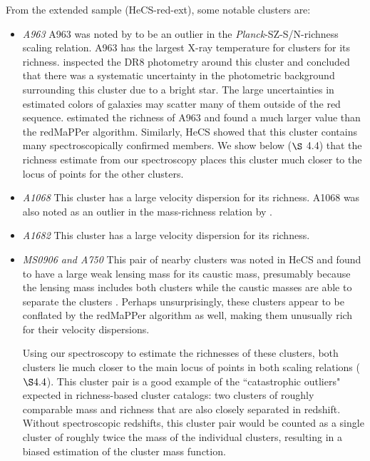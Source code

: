 From the extended sample (HeCS-red-ext), some notable clusters are:

\begin{itemize}

\item{\em A963} A963 was noted by \citet{rozo14d} to be an outlier in the 
{\em Planck}-SZ-S/N-richness scaling relation.  A963 has the largest 
X-ray temperature for clusters for its richness.  \citet{rozo14d} inspected the DR8 
photometry around this cluster and concluded that there was a 
systematic uncertainty in the photometric background surrounding this 
cluster due to a bright star. The large uncertainties in estimated colors of 
galaxies may scatter many of them outside of the red sequence.  
\citet{andreon14} estimated the richness of A963 and found a much 
larger value than the redMaPPer algorithm.  Similarly,
HeCS \citep{hecsultimate,hwang14} showed that this cluster 
contains many spectroscopically confirmed members.  We show below 
($\S$ 4.4) that the richness estimate from our spectroscopy places this 
cluster much closer to the locus of points for the other clusters. 

\item{\em A1068} This cluster has a large velocity dispersion for its richness.  
A1068 was also noted as an outlier in the mass-richness relation by \citet{andreon14}.

\item{\em A1682} This cluster has a large velocity dispersion for its richness.

\item{\em MS0906 and A750} This pair of nearby clusters was noted in 
HeCS and found to have a large weak lensing mass for its caustic 
mass, presumably because the lensing mass includes both clusters 
while the caustic masses are able to separate the clusters \citep{hecslens}.  
Perhaps unsurprisingly, these clusters appear to be conflated by the 
redMaPPer algorithm as well, making them unusually rich for their 
velocity dispersions.

Using our spectroscopy to estimate the richnesses of these clusters, 
both clusters lie much closer to the main locus of points in both scaling relations
($\S 4.4$). 
This cluster pair is a good example of the ``catastrophic outliers" expected in 
richness-based cluster catalogs: two clusters of roughly comparable mass and 
richness that are also closely separated in redshift. Without spectroscopic 
redshifts, this cluster pair would be counted as a single cluster of roughly 
twice the mass of the individual clusters, resulting in a biased estimation 
of the cluster mass function. 


\end{itemize}
